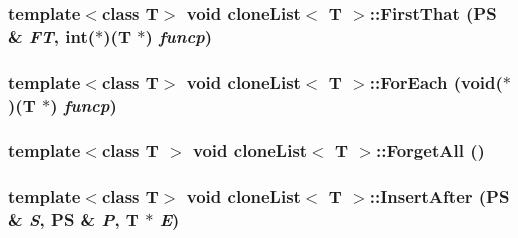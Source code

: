 \label{classclone_list_a761c3700fcf12c3f48b3c34d2a0aef7f}
\hypertarget{classclone_list_a81bb55f92d51e3ffbeff53440537c84d}{
\subsubsection[{FirstThat}]{\setlength{\rightskip}{0pt plus 5cm}template$<$class T$>$ void {\bf cloneList}$<$ T $>$::FirstThat ({\bf PS} \& {\em FT}, \/  int($\ast$)(T $\ast$) {\em funcp})}}
\label{classclone_list_a81bb55f92d51e3ffbeff53440537c84d}
\hypertarget{classclone_list_ac4911df1517c594f4e0537f62f2751bc}{
\subsubsection[{ForEach}]{\setlength{\rightskip}{0pt plus 5cm}template$<$class T$>$ void {\bf cloneList}$<$ T $>$::ForEach (void($\ast$)(T $\ast$) {\em funcp})}}
\label{classclone_list_ac4911df1517c594f4e0537f62f2751bc}
\hypertarget{classclone_list_a2e8c386500df44e04d8a8642ace18762}{
\subsubsection[{ForgetAll}]{\setlength{\rightskip}{0pt plus 5cm}template$<$class T $>$ void {\bf cloneList}$<$ T $>$::ForgetAll ()}}
\label{classclone_list_a2e8c386500df44e04d8a8642ace18762}
\hypertarget{classclone_list_aa6c5dda0ddabd776d8aa4cf115a338e4}{
\subsubsection[{InsertAfter}]{\setlength{\rightskip}{0pt plus 5cm}template$<$class T$>$ void {\bf cloneList}$<$ T $>$::InsertAfter ({\bf PS} \& {\em S}, \/  {\bf PS} \& {\em P}, \/  T $\ast$ {\em E})}}
\label{classclone_list_aa6c5dda0ddabd776d8aa4cf115a338e4}

